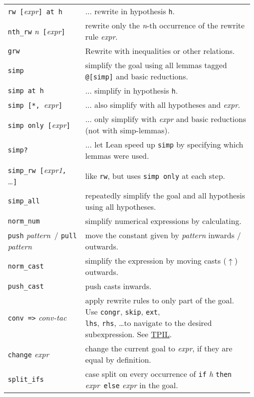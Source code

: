 \documentclass[a4paper]{article}
\newcommand{\lean}[1]{{\tt #1}}
\newcommand{\expr}[1][]{\textit{expr#1}\xspace}
\newcommand{\pattern}{\textit{pattern}\xspace}
\newcommand{\nat}{\textit{n}\xspace}
\begin{document}
\begin{center}
\begin{longtable}{@{}lp{113mm}@{}}
  \lean{rw [}\expr\lean{] at h} & $\ldots$ rewrite in hypothesis \lean{h}. \\
  \lean{nth\_rw} \nat\ \lean{[}\expr\lean{]} & rewrite only the \nat-th occurrence of the rewrite rule \expr.\\
  \lean{grw} & Rewrite with inequalities or other relations. \\
  \lean{simp} & simplify the goal using all lemmas tagged \lean{@[simp]} and basic reductions. \\
  \lean{simp at h} & $\ldots$ simplify in hypothesis \lean{h}. \\
  \lean{simp [*, }\expr\lean{]} & $\ldots$ also simplify with all hypotheses and \expr. \\
  \lean{simp only [}\expr\lean{]}& $\ldots$ only simplify with \expr and basic reductions (not with simp-lemmas). \\
  \lean{simp?}& $\ldots$ let Lean speed up \lean{simp} by specifying which lemmas were used. \\
  \lean{simp\_rw [}\expr[1]\lean{, }\ldots\lean{]} & like \lean{rw}, but uses \lean{simp only} at each step. \\
  \lean{simp\_all} & repeatedly simplify the goal and all hypothesis using all hypotheses.\\
  \lean{norm\_num} & simplify numerical expressions by calculating. \\
  \lean{push} \pattern\ / \lean{pull} \pattern & move the constant given by \pattern inwards / outwards.\\
  \lean{norm\_cast} & simplify the expression by moving casts ($\uparrow$) outwards.\\
  \lean{push\_cast} & push casts inwards.\\
  \lean{conv =>} \textit{conv-tac} &
    \makecell[lt]{apply rewrite rules to only part of the goal.
    Use \lean{congr}, \lean{skip}, \lean{ext}, \\ \lean{lhs}, \lean{rhs}, \ldots to navigate to the desired subexpression.
    See \href{https://docs.lean-lang.org/theorem_proving_in_lean4/conv.html}{TPIL}.}\\
  \lean{change} \expr & change the current goal to \expr, if they are equal by definition. \\
  \lean{split\_ifs} & case split on every occurrence of \lean{if} \textit{h} \lean{then} \expr\ \lean{else} \expr in the goal. \\

\end{longtable}
\end{center}
\end{document}
